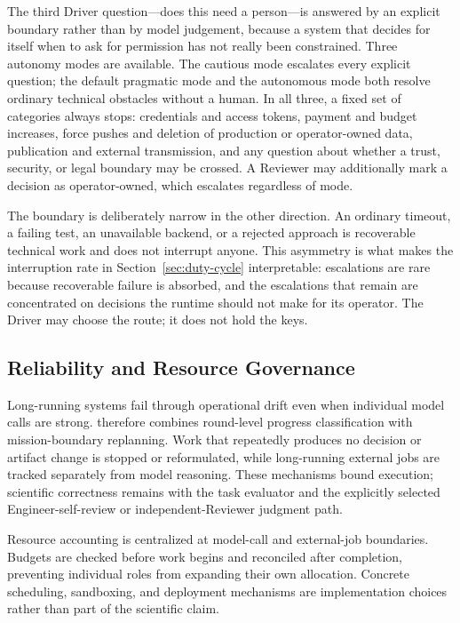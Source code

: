 The third Driver question---does this need a person---is answered by an explicit
boundary rather than by model judgement, because a system that decides for itself
when to ask for permission has not really been constrained. Three autonomy modes are
available. The cautious mode escalates every explicit question; the default
pragmatic mode and the autonomous mode both resolve ordinary technical obstacles
without a human. In all three, a fixed set of categories always stops: credentials
and access tokens, payment and budget increases, force pushes and deletion of
production or operator-owned data, publication and external transmission, and any
question about whether a trust, security, or legal boundary may be crossed. A
Reviewer may additionally mark a decision as operator-owned, which escalates
regardless of mode.

The boundary is deliberately narrow in the other direction. An ordinary timeout, a
failing test, an unavailable backend, or a rejected approach is recoverable technical
work and does not interrupt anyone. This asymmetry is what makes the interruption
rate in Section~\ref{sec:duty-cycle} interpretable: escalations are rare because
recoverable failure is absorbed, and the escalations that remain are concentrated on
decisions the runtime should not make for its operator. The Driver may choose the
route; it does not hold the keys.

\subsection{Reliability and Resource Governance}

Long-running systems fail through operational drift even when individual model
calls are strong. \systemname therefore combines round-level progress
classification with mission-boundary replanning. Work that repeatedly produces no
decision or artifact change is stopped or reformulated, while long-running external
jobs are tracked separately from model reasoning. These mechanisms bound execution;
scientific correctness remains with the task evaluator and the explicitly selected
Engineer-self-review or independent-Reviewer judgment path.

Resource accounting is centralized at model-call and external-job boundaries.
Budgets are checked before work begins and reconciled after completion, preventing
individual roles from expanding their own allocation. Concrete scheduling,
sandboxing, and deployment mechanisms are implementation choices rather than part
of the scientific claim.
